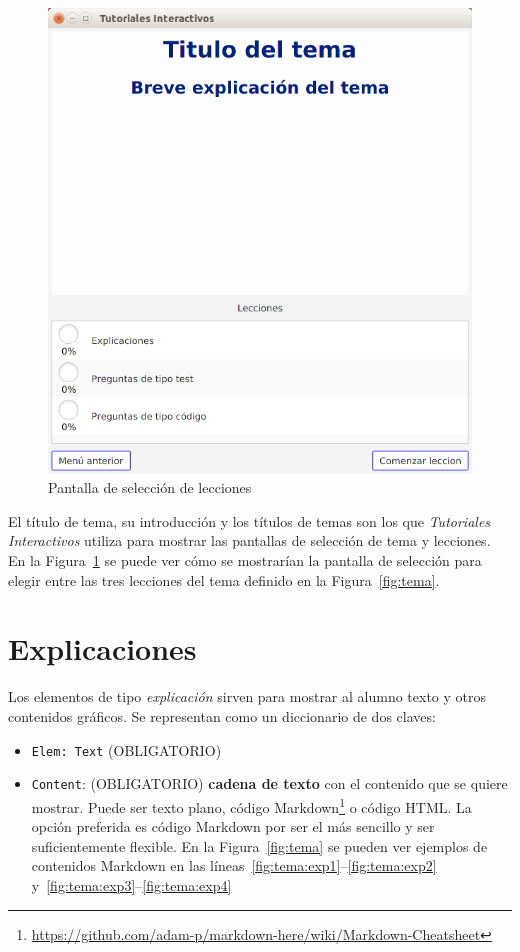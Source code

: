 \documentclass[]{article}
\newcommand{\code}[1]{{\lstinline[basicstyle=\ttfamily,mathescape]!#1!}}
\newcommand{\toolname}{\emph{Tutoriales Interactivos}}
\begin{document}
\begin{figure}[tb]
	\centerline{\includegraphics[scale=0.4]{lecciones}}
	\caption{Pantalla de selección de lecciones\label{fig:lecciones}}
\end{figure}

El título de tema, su introducción y los títulos de temas son los que \toolname{} utiliza para mostrar las pantallas de selección de tema y lecciones. En la Figura~\ref{fig:lecciones} se puede ver cómo se mostrarían la pantalla de selección para elegir entre las tres lecciones del tema definido en la Figura~\ref{fig:tema}.


\section{Explicaciones}\label{sec:explicaciones}
Los elementos de tipo \emph{explicación} sirven para mostrar al alumno texto y otros contenidos gráficos. Se representan como un diccionario de dos claves:
\begin{itemize}
	 \item \code{Elem: Text} {\sf (OBLIGATORIO)}
	 \item \code{Content}: {\sf (OBLIGATORIO)} \textbf{cadena de texto} con el contenido que se quiere mostrar. Puede ser texto plano, código Markdown\footnote{\url{https://github.com/adam-p/markdown-here/wiki/Markdown-Cheatsheet}} o código HTML. La opción preferida es código Markdown por ser el más sencillo y ser suficientemente flexible. En la Figura~\ref{fig:tema} se pueden ver ejemplos de contenidos Markdown en las líneas~\ref{fig:tema:exp1}--\ref{fig:tema:exp2} y~\ref{fig:tema:exp3}--\ref{fig:tema:exp4}
\end{itemize}
\end{document}
